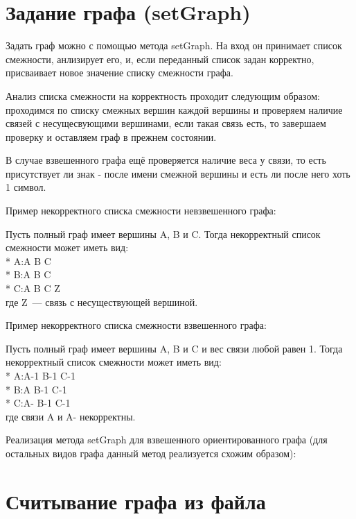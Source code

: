 \documentclass[bachelor, och, pract]{SCWorks}
\begin{document}
\section{Задание графа (setGraph)}

Задать граф можно с помощью метода setGraph. На вход он принимает
список смежности, анлизирует его, и, если переданный список задан
корректно, присваивает новое значение списку смежности графа.
\bigskip

Анализ списка смежности на корректность проходит следующим образом:
проходимся по списку смежных вершин каждой вершины и проверяем
наличие связей с несущесвующими вершинами, если такая связь есть,
то завершаем проверку и оставляем граф в прежнем состоянии.
\bigskip

В случае взвешенного графа ещё проверяется наличие веса у связи,
то есть присутствует ли знак - после имени смежной вершины и есть ли
после него хоть 1 символ.
\bigskip

Пример некорректного списка смежности невзвешенного графа:
\smallskip

Пусть полный граф имеет вершины A, B и C. Тогда некорректный список
смежности может иметь вид:\\*
A:A B C\\*
B:A B C\\*
C:A B C Z\\

где Z~--- связь с несуществующей вершиной.
\bigskip

Пример некорректного списка смежности взвешенного графа:
\smallskip

Пусть полный граф имеет вершины A, B и C и вес связи любой равен 1.
Тогда некорректный список смежности может иметь вид:\\*
A:A-1 B-1 C-1\\*
B:A B-1 C-1\\*
C:A- B-1 C-1\\

где связи A и A- некорректны.
\bigskip

Реализация метода setGraph для взвешенного ориентированного графа
(для остальных видов графа данный метод реализуется схожим образом):
\bigskip


\bigskip

\section{Считывание графа из файла}
\end{document}
